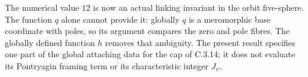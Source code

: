 \begin{remark}[Scope]
The numerical value $12$ is now an actual linking invariant in the
orbit five-sphere. The function $q$ alone cannot provide it: globally
$q$ is a meromorphic base coordinate with poles, so its argument
compares the zero and pole fibres. The globally defined function $h$
removes that ambiguity. The present result specifies one part of the
global attaching data for the cap of C.3.14; it does not evaluate its
Pontryagin framing term or its characteristic integer $J_\psi$.
\end{remark}

